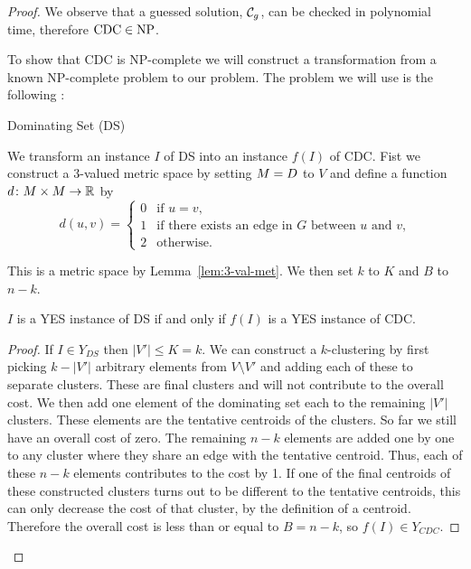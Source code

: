 \begin{proof}
  We observe that a guessed solution, $\mathcal{C}_g$, can be checked in polynomial
  time, therefore $\text{CDC} \in \text{NP}$.

  To show that CDC is NP-complete we will construct a transformation from a
  known NP-complete problem to our problem.  The problem we will use is the
  following \cite{gareyjohnson79}:
  \begin{problem}{Dominating Set (DS)}
  \end{problem}

  We transform an instance $I$ of DS into an instance $f(I)$ of CDC.  Fist we
  construct a 3-valued metric space by setting $M = D$ to $V$ and define a
  function $d \colon M \times M \to {\mathbb R}$ by
  \begin{equation*}
    d(u,v) = \begin{cases}
      0 & \text{if $u=v$,}\\
      1 & \text{if there exists an edge in $G$ between $u$ and $v$,}\\
      2 & \text{otherwise.}
    \end{cases}
  \end{equation*}

  This is a metric space by Lemma~\ref{lem:3-val-met}. We then set $k$ to $K$
  and $B$ to $n-k$.

  \begin{lem}
    \label{lem:iff}
    $I$ is a YES instance of DS if and only if $f(I)$ is a YES instance of CDC.
  \end{lem}

  \begin{proof}
    If $I \in Y_{DS}$ then $|V'| \leq K = k$.  We can construct a
    $k$-clustering by first picking $k-|V'|$ arbitrary elements from $V
    \setminus V'$ and adding each of these to separate clusters.  These are
    final clusters and will not contribute to the overall cost.  We then add
    one element of the dominating set each to the remaining $|V'|$ clusters.
    These elements are the tentative centroids of the clusters.  So far we
    still have an overall cost of zero.  The remaining $n-k$ elements are
    added one by one to any cluster where they share an edge with the
    tentative centroid.  Thus, each of these $n-k$ elements contributes to the
    cost by 1.  If one of the final centroids of these constructed clusters
    turns out to be different to the tentative centroids, this can only
    decrease the cost of that cluster, by the definition of a centroid.
    Therefore the overall cost is less than or equal to $B = n-k$, so $f(I)
    \in Y_{CDC}$.


\end{proof}
\end{proof}
